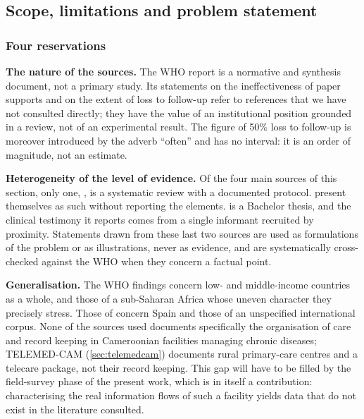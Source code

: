 \documentclass[12pt,a4paper,oneside]{report}
\begin{document}
\subsection{Scope, limitations and problem statement}\label{sec:scope-problem}

\subsubsection{Four reservations}

\textbf{The nature of the sources.} The WHO report is a normative and synthesis document, not a primary study. Its statements on the ineffectiveness of paper supports and on the extent of loss to follow-up refer to references that we have not consulted directly; they have the value of an institutional position grounded in a review, not of an experimental result. The figure of 50\% loss to follow-up is moreover introduced by the adverb ``often'' and has no interval: it is an order of magnitude, not an estimate.

\textbf{Heterogeneity of the level of evidence.} Of the four main sources of this section, only one, \textcite{dodoo2022}, is a systematic review with a documented protocol. \textcite{liu2025review} present themselves as such without reporting the elements. \textcite{navarro2023} is a Bachelor thesis, and the clinical testimony it reports comes from a single informant recruited by proximity. Statements drawn from these last two sources are used as formulations of the problem or as illustrations, never as evidence, and are systematically cross-checked against the WHO when they concern a factual point.

\textbf{Generalisation.} The WHO findings concern low- and middle-income countries as a whole, and those of \textcite{dodoo2022} a sub-Saharan Africa whose uneven character they precisely stress. Those of \textcite{navarro2023} concern Spain and those of \textcite{liu2025review} an unspecified international corpus. None of the sources used documents specifically the organisation of care and record keeping in Cameroonian facilities managing chronic diseases; TELEMED-CAM (\cref{sec:telemedcam}) documents rural primary-care centres and a telecare package, not their record keeping. This gap will have to be filled by the field-survey phase of the present work, which is in itself a contribution: characterising the real information flows of such a facility yields data that do not exist in the literature consulted.
\end{document}
